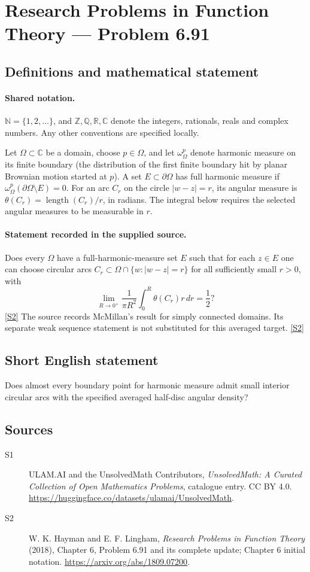 \documentclass[11pt]{article}
\newcommand{\sref}[2]{\hyperlink{source:#1:#2}{[S#2]}}
\begin{document}
\section{Research Problems in Function Theory — Problem 6.91}\label{statement}

\subsection{Definitions and mathematical statement}

\paragraph{Shared notation.}$\mathbb N=\{1,2,\ldots\}$, and $\mathbb Z,\mathbb Q,\mathbb R,\mathbb C$ denote the integers, rationals, reals and complex numbers. Any other conventions are specified locally.


Let $\Omega\subset\mathbb C$ be a domain, choose $p\in\Omega$, and let $\omega_\Omega^p$ denote harmonic measure on its finite boundary (the distribution of the first finite boundary hit by planar Brownian motion started at $p$). A set $E\subset\partial\Omega$ has full harmonic measure if $\omega_\Omega^p(\partial\Omega\setminus E)=0$. For an arc $C_r$ on the circle $|w-z|=r$, its angular measure is $\theta(C_r)=\operatorname{length}(C_r)/r$, in radians. The integral below requires the selected angular measures to be measurable in $r$.
\paragraph{Statement recorded in the supplied source.}
Does every $\Omega$ have a full-harmonic-measure set $E$ such that for each $z\in E$ one can choose circular arcs $C_r\subset\Omega\cap\{w:|w-z|=r\}$ for all sufficiently small $r>0$, with \[\lim_{R\to0^+}\frac1{\pi R^2}\int_0^R\theta(C_r)r\,dr=\frac12?\] \sref{statement}{2}
The source records McMillan's result for simply connected domains. Its separate weak sequence statement is not substituted for this averaged target. \sref{statement}{2}
\subsection{Short English statement}
Does almost every boundary point for harmonic measure admit small interior circular arcs with the specified averaged half-disc angular density?
\subsection{Sources}
\begin{description}
\item[\hypertarget{source:statement:1}{S1}] ULAM.AI and the UnsolvedMath Contributors, \emph{UnsolvedMath: A Curated Collection of Open Mathematics Problems}, catalogue entry. CC BY 4.0. \url{https://huggingface.co/datasets/ulamai/UnsolvedMath}.
\item[\hypertarget{source:statement:2}{S2}] W. K. Hayman and E. F. Lingham, \emph{Research Problems in Function Theory} (2018), Chapter 6, Problem 6.91 and its complete update; Chapter 6 initial notation. \url{https://arxiv.org/abs/1809.07200}.
\end{description}
\label{end:statement}
\end{document}
